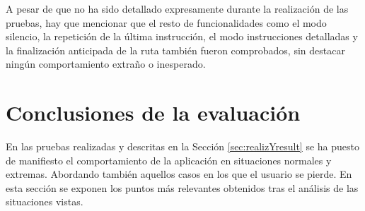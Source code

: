 A pesar de que no ha sido detallado expresamente durante la realización de las pruebas, hay que mencionar que el resto de funcionalidades como el modo silencio, la repetición de la última instrucción, el modo instrucciones detalladas y la finalización anticipada de la ruta también fueron comprobados, sin destacar ningún comportamiento extraño o inesperado.

\section{Conclusiones de la evaluación}
\label{sec:conclusionesEval}

En las pruebas realizadas y descritas en la Sección \ref{sec:realizYresult} se ha puesto de manifiesto el comportamiento de la aplicación en situaciones normales y extremas. Abordando también aquellos casos en los que el usuario se pierde. En esta sección se exponen los puntos más relevantes obtenidos tras el análisis de las situaciones vistas.


